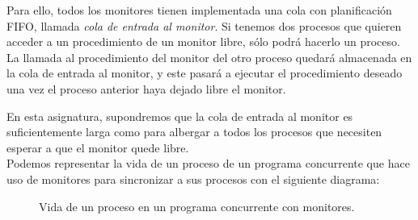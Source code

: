 Para ello, todos los monitores tienen implementada una cola con planificación FIFO, llamada \emph{cola de entrada al monitor}. Si tenemos dos procesos que quieren acceder a un procedimiento de un monitor libre, sólo podrá hacerlo un proceso. La llamada al procedimiento del monitor del otro proceso quedará almacenada en la cola de entrada al monitor, y este pasará a ejecutar el procedimiento deseado una vez el proceso anterior haya dejado libre el monitor. 

En esta asignatura, supondremos que la cola de entrada al monitor es suficientemente larga como para albergar a todos los procesos que necesiten esperar a que el monitor quede libre.\\

Podemos representar la vida de un proceso de un programa concurrente que hace uso de monitores para sincronizar a sus procesos con el siguiente diagrama:
\begin{figure}[H]
\caption{Vida de un proceso en un programa concurrente con monitores.}
\end{figure}

